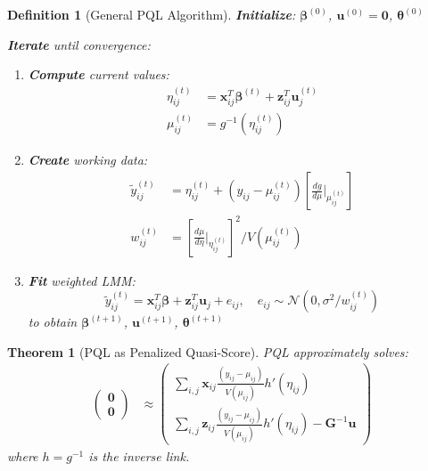 \documentclass{article}
\newtheorem{definition}{Definition}
\newtheorem{theorem}{Theorem}
\begin{document}
\begin{definition}[General PQL Algorithm]
\textbf{Initialize}: $\boldsymbol{\beta}^{(0)}$, $\mathbf{u}^{(0)} = \mathbf{0}$, $\boldsymbol{\theta}^{(0)}$

\textbf{Iterate} until convergence:
\begin{enumerate}
    \item \textbf{Compute} current values:
    \begin{align}
    \eta_{ij}^{(t)} &= \mathbf{x}_{ij}^T\boldsymbol{\beta}^{(t)} + \mathbf{z}_{ij}^T\mathbf{u}_j^{(t)} \\
    \mu_{ij}^{(t)} &= g^{-1}(\eta_{ij}^{(t)})
    \end{align}
    
    \item \textbf{Create} working data:
    \begin{align}
    \tilde{y}_{ij}^{(t)} &= \eta_{ij}^{(t)} + (y_{ij} - \mu_{ij}^{(t)})\left[\frac{dg}{d\mu}\bigg|_{\mu_{ij}^{(t)}}\right] \\
    w_{ij}^{(t)} &= \left[\frac{d\mu}{d\eta}\bigg|_{\eta_{ij}^{(t)}}\right]^2 / V(\mu_{ij}^{(t)})
    \end{align}
    
    \item \textbf{Fit} weighted LMM:
    \begin{equation}
    \tilde{y}_{ij}^{(t)} = \mathbf{x}_{ij}^T\boldsymbol{\beta} + \mathbf{z}_{ij}^T\mathbf{u}_j + e_{ij}, \quad e_{ij} \sim \mathcal{N}(0, \sigma^2/w_{ij}^{(t)})
    \end{equation}
    to obtain $\boldsymbol{\beta}^{(t+1)}$, $\mathbf{u}^{(t+1)}$, $\boldsymbol{\theta}^{(t+1)}$
\end{enumerate}
\end{definition}

\begin{theorem}[PQL as Penalized Quasi-Score]
PQL approximately solves:
\begin{align}
\begin{pmatrix} \mathbf{0} \\ \mathbf{0} \end{pmatrix} &\approx 
\begin{pmatrix}
\sum_{i,j} \mathbf{x}_{ij}\frac{(y_{ij} - \mu_{ij})}{V(\mu_{ij})}h'(\eta_{ij}) \\
\sum_{i,j} \mathbf{z}_{ij}\frac{(y_{ij} - \mu_{ij})}{V(\mu_{ij})}h'(\eta_{ij}) - \mathbf{G}^{-1}\mathbf{u}
\end{pmatrix}
\end{align}
where $h = g^{-1}$ is the inverse link.
\end{theorem}
\end{document}
